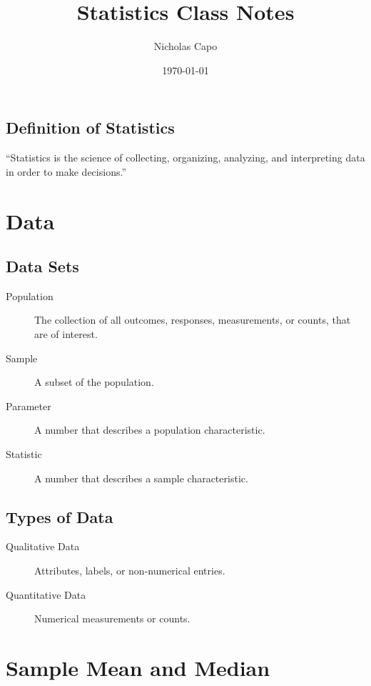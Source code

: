 \documentclass{article}
\author{Nicholas Capo}
\date{\today}
\title{Statistics Class Notes}
\begin{document}
\maketitle
\newpage
\tableofcontents
\newpage

\subsection{Definition of Statistics}

\enquote{Statistics is the science of collecting, organizing, analyzing, and interpreting data in order to make decisions.}

\section{Data}

\subsection{Data Sets}
\begin{description}
\item[Population] The collection of all outcomes, responses, measurements, or counts, that are of interest.

\item[Sample] A subset of the population.

\item[Parameter] A number that describes a population characteristic.

\item[Statistic] A number that describes a sample characteristic.
\end{description}

\subsection{Types of Data}

\begin{description}
\item[Qualitative Data] Attributes, labels, or non-numerical entries.

\item[Quantitative Data] Numerical measurements or counts.
\end{description}

\section{Sample Mean and Median}
\end{document}
